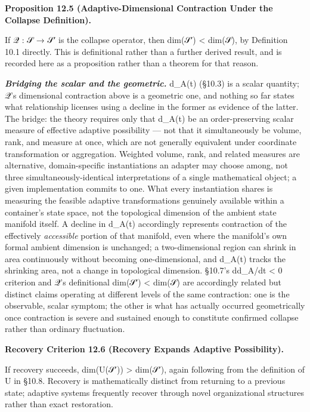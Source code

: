 \documentclass[
]{article}
\begin{document}
\textbf{Proposition 12.5 (Adaptive-Dimensional Contraction Under the
Collapse Definition).}

If 𝒬 : 𝒮 → 𝒮′ is the collapse operator, then dim(𝒮′) \textless{} dim(𝒮),
by Definition 10.1 directly. This is definitional rather than a further
derived result, and is recorded here as a proposition rather than a
theorem for that reason.

\emph{\textbf{Bridging the scalar and the geometric.}} d\_A(t) (§10.3)
is a scalar quantity; 𝒬's dimensional contraction above is a geometric
one, and nothing so far states what relationship licenses using a
decline in the former as evidence of the latter. The bridge: the theory
requires only that d\_A(t) be an order-preserving scalar measure of
effective adaptive possibility --- not that it simultaneously be volume,
rank, and measure at once, which are not generally equivalent under
coordinate transformation or aggregation. Weighted volume, rank, and
related measures are alternative, domain-specific instantiations an
adapter may choose among, not three simultaneously-identical
interpretations of a single mathematical object; a given implementation
commits to one. What every instantiation shares is measuring the
feasible adaptive transformations genuinely available within a
container's state space, not the topological dimension of the ambient
state manifold itself. A decline in d\_A(t) accordingly represents
contraction of the effectively \emph{accessible} portion of that
manifold, even where the manifold's own formal ambient dimension is
unchanged; a two-dimensional region can shrink in area continuously
without becoming one-dimensional, and d\_A(t) tracks the shrinking area,
not a change in topological dimension. §10.7's dd\_A/dt \textless{} 0
criterion and 𝒬's definitional dim(𝒮′) \textless{} dim(𝒮) are
accordingly related but distinct claims operating at different levels of
the same contraction: one is the observable, scalar symptom; the other
is what has actually occurred geometrically once contraction is severe
and sustained enough to constitute confirmed collapse rather than
ordinary fluctuation.

\textbf{Recovery Criterion 12.6 (Recovery Expands Adaptive
Possibility).}

If recovery succeeds, dim(U(𝒮′)) \textgreater{} dim(𝒮′), again following
from the definition of U in §10.8. Recovery is mathematically distinct
from returning to a previous state; adaptive systems frequently recover
through novel organizational structures rather than exact restoration.
\end{document}
